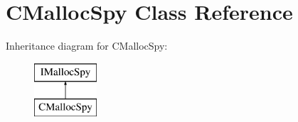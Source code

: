 \hypertarget{class_c_malloc_spy}{\section{C\-Malloc\-Spy Class Reference}
\label{class_c_malloc_spy}
}
Inheritance diagram for C\-Malloc\-Spy\-:\begin{figure}[H]
\begin{center}
\leavevmode
\includegraphics[height=2.000000cm]{class_c_malloc_spy}
\end{center}
\end{figure}
